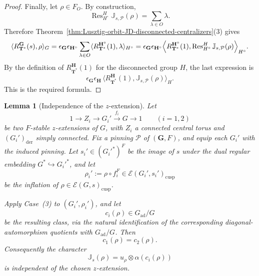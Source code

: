 \documentclass{amsart}
\theoremstyle{plain}
\numberwithin{equation}{section}
\newtheorem{lemma}[theorem]{Lemma}
\theoremstyle{definition}
\newcommand{\cP}{\mathcal{P}}
\newcommand{\cE}{\mathcal{E}}
\newcommand{\Res}{\operatorname{Res}}
\newcommand{\J}{\mathbb{J}}
\newcommand{\ad}{\operatorname{ad}}
\newcommand{\der}{\operatorname{der}}
\newcommand{\cusp}{\operatorname{cusp}}
\newcommand{\bG}{\mathbf{G}}
\newcommand{\bT}{\mathbf{T}}
\newcommand{\bH}{\mathbf{H}}
\begin{document}
\begin{proof}
Finally, let \(\rho\in F_O\). By construction,
\[
\Res^H_{H^\circ}\J_{s,\cP}(\rho)=\sum_{\lambda\in O}\lambda.
\]
Therefore Theorem~\ref{thm:Lusztig-orbit-JD-disconnected-centralizers}(3) gives
\[
\langle R_{\bT^*}^{\bG}(s),\rho\rangle_G
=
\epsilon_{\bG}\epsilon_{\bH^\circ}
\sum_{\lambda\in O}
\langle R_{\bT^*}^{\bH^\circ}(1),\lambda\rangle_{H^\circ}
=
\epsilon_{\bG}\epsilon_{\bH^\circ}
\Bigl\langle
R_{\bT^*}^{\bH^\circ}(1),\Res^H_{H^\circ}\J_{s,\cP}(\rho)
\Bigr\rangle_{H^\circ}.
\]
By the definition of \(R_{\bT^*}^{\bH}(1)\) for the disconnected group \(H\), the last expression is
\[
\epsilon_{\bG}\epsilon_{\bH}\,
\langle R_{\bT^*}^{\bH}(1),\J_{s,\cP}(\rho)\rangle_H.
\]
This is the required formula.
\end{proof}
\begin{lemma}[Independence of the \(z\)-extension]
\label{lem:zext-independence}
Let
\[
1\longrightarrow Z_i \longrightarrow G_i' \xrightarrow{\,f_i\,} G \longrightarrow 1
\qquad (i=1,2)
\]
be two \(F\)-stable \(z\)-extensions of \(G\), with \(Z_i\) a connected central torus and
\((G_i')_{\der}\) simply connected. Fix a pinning \(\cP\) of \((\bG,F)\), and equip each
\(G_i'\) with the induced pinning. Let \(s_i'\in (G_i'^*)^F\) be the image of \(s\) under the
dual regular embedding \(G^* \hookrightarrow G_i'^*\), and let
\[
\rho_i' := \rho\circ f_i^F \in \cE(G_i',s_i')_{\cusp}
\]
be the inflation of \(\rho\in \cE(G,s)_{\cusp}\).

Apply Case~\textup{(3)} to \((G_i',\rho_i')\), and let
\[
c_i(\rho)\in G_{\ad}/G
\]
be the resulting class, via the natural identification of the corresponding diagonal-automorphism
quotients with \(G_{\ad}/G\). Then
\[
c_1(\rho)=c_2(\rho).
\]
Consequently the character
\[
\J_s(\rho)=u_\rho\otimes \alpha(c_i(\rho))
\]
is independent of the chosen \(z\)-extension.
\end{lemma}
\end{document}

